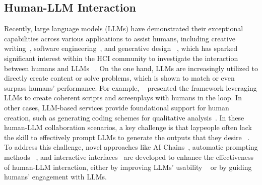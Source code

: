 \subsection{Human-LLM Interaction}

Recently, large language models (LLMs) have demonstrated their exceptional capabilities across various applications to assist humans, including creative writing~\cite{wang2024weaver,yuan2022wordcraft,li2024value}, software engineering~\cite{nam2024using,ni2023lever}, and generative design ~\cite{huang2024graphimind}, which has sparked significant interest within the HCI community to investigate the interaction between humans and LLMs ~\cite{gao2024taxonomy,kim2024understanding,10.1145/3613904.3642002,chiang2024enhancing,li-etal-2024-disclosure}. On the one hand, LLMs are increasingly utilized to directly create content or solve problems, which is shown to match or even surpass humans' performance. For example, \citeauthor{10.1145/3544548.3581225}~ presented the framework leveraging LLMs to create coherent scripts and screenplays with humans in the loop. 
In other cases, LLM-based services provide foundational support for human creation, such as generating coding schemes for qualitative analysis~\cite{chew2023llm}. 
In these human-LLM collaboration scenarios, a key challenge is that laypeople often lack the skill to effectively prompt LLMs to generate the outputs that they desire ~\cite{zamfirescu2023johnny}. To address this challenge, novel approaches like AI Chains~\cite{wu2022ai}, automatic prompting methods ~\cite{shin2020autoprompt}, and interactive interfaces~\cite{wang2024lave,liu2024make} are developed to enhance the effectiveness of human-LLM interaction, either by improving LLMs' usability ~\cite{hong2024next,yang2024human} or by guiding humans' engagement with LLMs.

